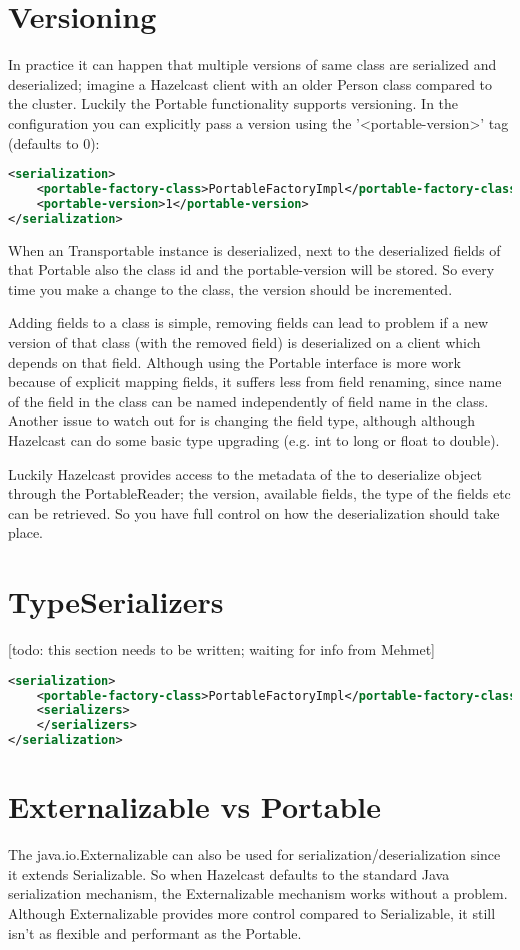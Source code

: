 \section{Versioning}
In practice it can happen that multiple versions of same class are serialized and deserialized; imagine a Hazelcast client with an older Person class compared to the cluster. Luckily the Portable functionality supports versioning. In the configuration you can explicitly pass a version using the '<portable-version>' tag (defaults to 0):
\begin{lstlisting}[language=xml]
<serialization>
    <portable-factory-class>PortableFactoryImpl</portable-factory-class>
    <portable-version>1</portable-version>
</serialization>
\end{lstlisting}
When an Transportable instance is deserialized, next to the deserialized fields of that Portable also the class id and the portable-version will be stored. So every time you make a change to the class, the version should be incremented. 

Adding fields to a class is simple, removing fields can lead to problem if a new version of that class (with the removed field) is deserialized on a client which depends on that field. Although using the Portable interface is more work because of explicit mapping fields, it suffers less from field renaming, since name of the field in the class can be named independently of field name in the class. Another issue to watch out for is changing the field type, although although Hazelcast can do some basic type upgrading (e.g. int to long or float to double). 

Luckily Hazelcast provides access to the metadata of the to deserialize object through the PortableReader; the  version, available fields, the type of the fields etc can be retrieved. So you have full control on how the deserialization should take place. 

\section{TypeSerializers}
[todo: this section needs to be written; waiting for info from Mehmet]
\begin{lstlisting}[language=xml]
<serialization>
    <portable-factory-class>PortableFactoryImpl</portable-factory-class>
    <serializers>
    </serializers>
</serialization>
\end{lstlisting}

\section{Externalizable vs Portable}
The java.io.Externalizable can also be used for serialization/deserialization since it extends Serializable. So when Hazelcast defaults to the standard Java serialization mechanism, the Externalizable mechanism works without a problem. Although Externalizable provides more control compared to Serializable, it still isn't as flexible and performant as the Portable.

